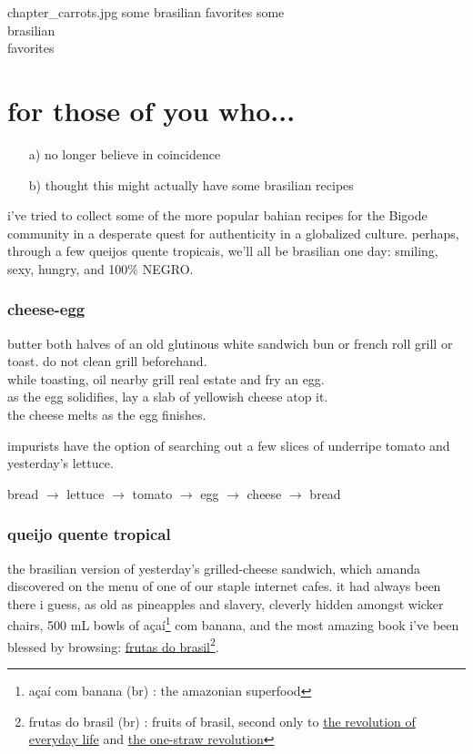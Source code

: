 \mychapter
{chapter_carrots.jpg}
{some brasilian favorites}
{some\\brasilian\\favorites}

\section{for those of you who...}

\begin{enumerate}
  \item[a)] no longer believe in coincidence
  \item[b)] thought this might actually have some brasilian recipes
\end{enumerate}

i've tried to collect some of the more popular bahian recipes for the
Bigode community in a desperate quest for authenticity in a globalized
culture. perhaps, through a few queijos quente tropicais, we'll all be
brasilian one day: smiling, sexy, hungry, and 100\% NEGRO.

\subsubsection{cheese-egg}

butter both halves of an old glutinous white sandwich bun or french
roll grill or toast. do not clean grill beforehand.\\
while toasting, oil nearby grill real estate and fry an egg.\\
as the egg solidifies, lay a slab of yellowish cheese atop it.\\
the cheese melts as the egg finishes.

impurists have the option of searching out a few slices of underripe
tomato and yesterday's lettuce.

bread $\rightarrow$ lettuce $\rightarrow$ tomato $\rightarrow$ egg
$\rightarrow$ cheese $\rightarrow$ bread

\subsubsection{queijo quente tropical}

the brasilian version of yesterday's grilled-cheese sandwich, which
amanda discovered on the menu of one of our staple internet cafes. it
had always been there i guess, as old as pineapples and slavery,
cleverly hidden amongst wicker chairs, 500 mL bowls of
a\c{c}a\'{i}\footnote{a\c{c}a\'{i} com banana (br) : the amazonian
superfood} com banana, and the most amazing book i've been blessed by
browsing: \underline{frutas do brasil}\footnote{frutas do brasil (br)
: fruits of brasil, second only to \underline{the revolution of
everyday life} and \underline{the one-straw revolution}}.

